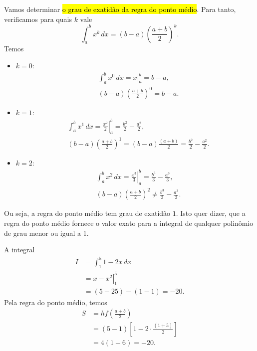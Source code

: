 Vamos determinar \hl{o grau de exatidão da regra do ponto médio}. Para tanto, verificamos para quais $k$ vale
\begin{equation}
  \int_a^b x^k\,dx = (b-a)\left(\frac{a+b}{2}\right)^k.
\end{equation}
Temos
\begin{itemize}
\item $k=0$:
  \begin{align}
    &\int_a^b x^0\,dx = \left. x\right|_a^b = b-a,\\
    &(b-a)\left(\frac{a+b}{2}\right)^0 = b-a.
  \end{align}
\item $k=1$:
  \begin{align}
    &\int_a^b x^1\,dx = \left. \frac{x^2}{2}\right|_a^b = \frac{b^2}{2}-\frac{a^2}{2},\\
    &(b-a)\left(\frac{a+b}{2}\right)^1 = (b-a)\frac{(a+b)}{2} = \frac{b^2}{2}-\frac{a^2}{2}.
  \end{align}
\item $k=2$:
  \begin{align}
    &\int_a^b x^2\,dx = \left. \frac{x^3}{3}\right|_a^b = \frac{b^3}{3}-\frac{a^3}{3},\\
    &(b-a)\left(\frac{a+b}{2}\right)^2 \neq \frac{b^3}{3}-\frac{a^3}{3}.
  \end{align}
\end{itemize}
Ou seja, a regra do ponto médio tem grau de exatidão $1$. Isto quer dizer, que a regra do ponto médio fornece o valor exato para a integral de qualquer polinômio de grau menor ou igual a 1.

\begin{ex}
  A integral
  \begin{subequations}
    \begin{align}
    I &= \int_1^5 1-2x\,dx\\
      &= \left. x - x^2\right|_{1}^5\\
      &= (5-25) - (1-1) = -20.
    \end{align}
  \end{subequations}
  Pela regra do ponto médio, temos
  \begin{subequations}
    \begin{align}
      S &= hf\left(\frac{a+b}{2}\right)\\
        &= (5-1)\left[1 - 2\cdot \frac{(1+5)}{2}\right]\\
        &= 4(1 - 6) = -20.
    \end{align}
  \end{subequations}
\end{ex}

